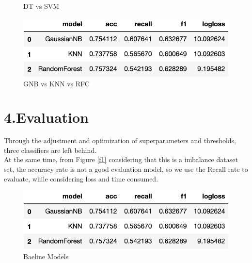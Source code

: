 \documentclass[11pt]{article}
\begin{document}
\begin{figure}[H]
    \centering
    \caption{DT vs SVM}
\end{figure}

\begin{figure}[H]
    \centering
    \includegraphics[width=1\textwidth]{three}
    \caption{GNB vs KNN vs RFC}
\end{figure}


\section{4.Evaluation}
Through the adjustment and optimization of superparameters and thresholds, three classifiers are left behind.\\
At the same time, from Figure \ref{f1} considering that this is a imbalance dataset set, the accuracy rate is not a good evaluation model, so we use the Recall rate to evaluate, while considering loss and time consumed.

\begin{figure}[H]
    \centering
    \includegraphics[width=1\textwidth]{three}
    \caption{Baeline Models}
\end{figure}
\end{document}
